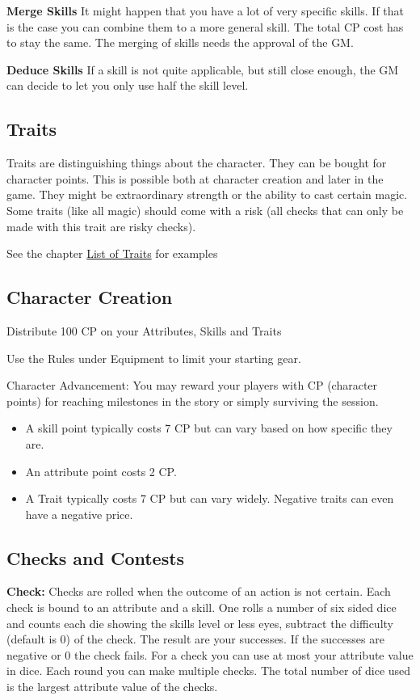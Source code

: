\documentclass[11pt]{article}
\begin{document}
{\begin{multicols}{2}[]
\textbf{Merge Skills}
It might happen that you have a lot of very specific skills. If that is the case you can combine them to a more general skill. The total CP cost has to stay the same. The merging of skills needs the approval of the GM.

\textbf{Deduce Skills}
If a skill is not quite applicable, but still close enough, the GM can decide to let you only use half the skill level. 

\subsection{Traits}
\label{sec:org30e5ebc}
Traits are distinguishing things about the character. They can be bought for character points. This is possible both at character creation and later in the game.
They might be extraordinary strength or the ability to cast certain magic. Some traits (like all magic) should come with a risk (all checks that can only be made with this trait are risky checks).

See the chapter \hyperref[sec:org4b98773]{List of Traits} for examples

\subsection{Character Creation}
\label{sec:org3ef2f9d}
Distribute 100 CP on your Attributes, Skills and Traits

Use the Rules under Equipment to limit your starting gear.

Character Advancement:
You may reward your players with CP (character points) for reaching milestones in the story or simply surviving the session.

\begin{itemize}
\item A skill point typically costs 7 CP but can vary based on how specific they are.
\item An attribute point costs 2 CP.
\item A Trait typically costs 7 CP but can vary widely. Negative traits can even have a negative price.
\end{itemize}

\subsection{Checks and Contests}
\label{sec:orga6ddd85}
\textbf{Check:}
Checks are rolled when the outcome of an action is not certain. Each check is bound to an attribute and a skill. One rolls a number of six sided dice and counts each die showing the skills level or less eyes, subtract the difficulty (default is 0) of the check. The result are your successes. If the successes are negative or 0 the check fails. For a check you can use at most your attribute value in dice.
Each round you can make multiple checks. The total number of dice used is the largest attribute value of the checks. 


\end{multicols}}
\end{document}

